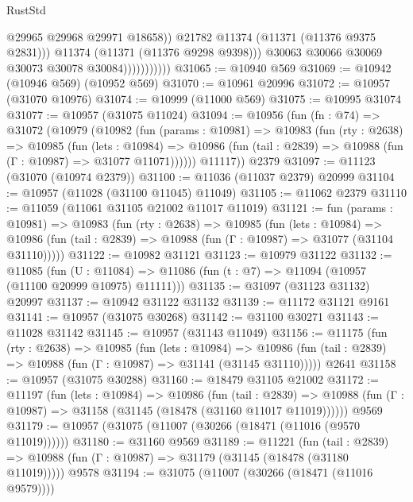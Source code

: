 \begin{lexlean}{RustStd}
\begin{coremodule}
                                  @29965
                                  @29968
                                  @29971
                                  @18658))
                              @21782
                              @11374
                              (@11371 (@11376 @9375 @2831)))
                            @11374
                            (@11371 (@11376 @9298 @9398)))
                          @30063
                          @30066
                          @30069
                          @30073
                          @30078
                          @30084)))))))))))
@31065 := @10940 @569
@31069 := @10942 (@10946 @569) (@10952 @569)
@31070 := @10961 @20996
@31072 := @10957 (@31070 @10976)
@31074 := @10999 (@11000 @569)
@31075 := @10995 @31074
@31077 := @10957 (@31075 @11024)
@31094 := @10956
    (fun (fn : @74) =>
    @31072
      (@10979
        (@10982
          (fun (params : @10981) =>
          @10983
            (fun (rty : @2638) =>
            @10985
              (fun (lets : @10984) =>
              @10986 (fun (tail : @2839) => @10988 (fun (Γ : @10987) => @31077 @11071))))))
        @11117))
    @2379
@31097 := @11123 (@31070 (@10974 @2379))
@31100 := @11036 (@11037 @2379) @20999
@31104 := @10957 (@11028 (@31100 @11045) @11049)
@31105 := @11062 @2379
@31110 := @11059 (@11061 @31105 @21002 @11017 @11019)
@31121 := fun (params : @10981) =>
  @10983
    (fun (rty : @2638) =>
    @10985
      (fun (lets : @10984) =>
      @10986 (fun (tail : @2839) => @10988 (fun (Γ : @10987) => @31077 (@31104 @31110)))))
@31122 := @10982 @31121
@31123 := @10979 @31122
@31132 := @11085
    (fun (U : @11084) => @11086 (fun (t : @7) => @11094 (@10957 (@11100 @20999 @10975) @11111)))
@31135 := @31097 (@31123 @31132) @20997
@31137 := @10942 @31122 @31132
@31139 := @11172 @31121 @9161
@31141 := @10957 (@31075 @30268)
@31142 := @31100 @30271
@31143 := @11028 @31142
@31145 := @10957 (@31143 @11049)
@31156 := @11175
    (fun (rty : @2638) =>
    @10985
      (fun (lets : @10984) =>
      @10986 (fun (tail : @2839) => @10988 (fun (Γ : @10987) => @31141 (@31145 @31110)))))
    @2641
@31158 := @10957 (@31075 @30288)
@31160 := @18479 @31105 @21002
@31172 := @11197
    (fun (lets : @10984) =>
    @10986
      (fun (tail : @2839) =>
      @10988 (fun (Γ : @10987) => @31158 (@31145 (@18478 (@31160 @11017 @11019))))))
    @9569
@31179 := @10957 (@31075 (@11007 (@30266 (@18471 (@11016 (@9570 @11019))))))
@31180 := @31160 @9569
@31189 := @11221
    (fun (tail : @2839) => @10988 (fun (Γ : @10987) => @31179 (@31145 (@18478 (@31180 @11019)))))
    @9578
@31194 := @31075 (@11007 (@30266 (@18471 (@11016 @9579))))

\end{coremodule}
\end{lexlean}
